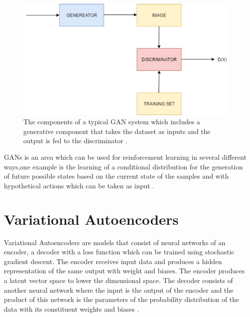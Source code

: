 \begin{figure}
  \centering
  \includegraphics[width=1\linewidth]{graphics/generational_models/gan.png}
  \caption[Caption for GAN]{The components of a typical GAN system which includes a generative component that takes the dataset as inputs and the output is fed to the discriminator \protect \footnotemark.}
  \label{fig:GAN}
\end{figure}

GANs is an area which can be used  for reinforcement learning in several different ways,one example is the learning of a conditional distribution for the generation of future possible states based on the current state of the samples and with hypothetical actions which can be taken as input \citep{goodfellow:2016}.

\section{Variational Autoencoders}

Variational Autoencoders  are models that consist of neural networks of an encoder, a decoder with a loss function which can be trained using stochastic gradient descent. The encoder receives input data and produces a hidden representation of the same output with weight and biases. The encoder produces a latent vector space to lower the dimensional space.
The decoder consists of another neural network where the input is the output of the encoder and the product of this network is the parameters of the probability distribution of the data with its constituent weights and biases \citep{doersch:2016}.


